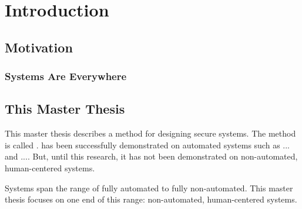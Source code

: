 \documentclass[../../main/main.tex]{subfiles}
\begin{document}
\glsresetall

\chapter{Introduction}

\section{Motivation}\label{sec:intro:motivation}
\subsection{Systems Are Everywhere}

\section{This Master Thesis}\label{sec:thismasterthesis}
\glsresetall
This master thesis describes a method for designing secure systems.  The method is called .    has been successfully demonstrated on automated systems such as ... and ....  But, until this research, it has not been demonstrated on non-automated, human-centered systems.  

Systems span the range of fully automated to fully non-automated.  This master thesis focuses on one end of this range: non-automated, human-centered systems.
\end{document}
